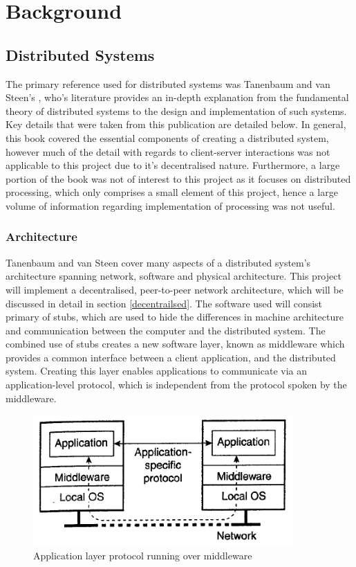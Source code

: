 \documentclass[a4paper, 11pt]{report}
\begin{document}
\chapter{Background}

\section{Distributed Systems} \label{dist}
The primary reference used for distributed systems was Tanenbaum and van Steen's \cite{tanenbaumdist}, who's literature provides an in-depth explanation from the fundamental theory of distributed systems to the design and implementation of such systems. Key details that were taken from this publication are detailed below. In general, this book covered the essential components of creating a distributed system, however much of the detail with regards to client-server interactions was not applicable to this project due to it's decentralised nature. Furthermore, a large portion of the book was not of interest to this project as it focuses on distributed processing, which only comprises a small element of this project, hence a large volume of information regarding implementation of processing was not useful.

\subsection{Architecture}
Tanenbaum and van Steen cover many aspects of a distributed system's architecture spanning network, software and physical architecture. This project will implement a decentralised, peer-to-peer network architecture, which will be discussed in detail in section \ref{decentrailsed}. The software used will consist primary of \gls{stub}s, which are used to hide the differences in machine architecture and communication between the computer and the distributed system. The combined use of \gls{stub}s creates a new software layer, known as \gls{middleware} which provides a common interface between a client application, and the distributed system. Creating this layer enables applications to communicate via an application-level protocol, which is independent from the protocol spoken by the \gls{middleware}.

\begin{figure}[H]
\centering
\includegraphics[height=5cm,keepaspectratio]{appl_layer_proto}
\caption{Application layer protocol running over \gls{middleware} \cite{tanenbaumdist}} 
\label{fig:middlewarelayers}
\end{figure}
\end{document}
